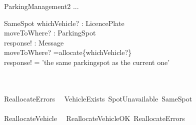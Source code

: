 \documentclass[12pt]{article}
\begin{document}
\begin{spacing}{1.5}
\newpage

\begin{class}{ParkingManagement2}
\also
... \\
\begin{op}{SameSpot}
whichVehicle? : LicencePlate\\
moveToWhere? : ParkingSpot\\
response! : Message\\
\ST
moveToWhere? =allocate\{whichVehicle?\}\\
response! =\: 'the \: same \: parkingspot \: as \: the \: current \: one'\\
\end{op}\\
~\\
ReallocateErrors \, \hat{=} \, VehicleExists \,\vee SpotUnavailable \,\vee SameSpot\\
~\\
ReallocateVehicle \, \hat{=} \, ReallocateVehicleOK \,\vee ReallocateErrors\\
\end{class}


\end{spacing}
\end{document}
